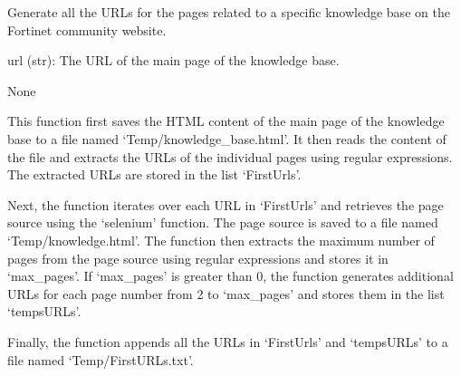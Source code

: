 \documentclass[letterpaper,10pt,english]{sphinxmanual}
\begin{document}
\begin{fulllineitems}
\label{\detokenize{Project.Script:Project.Script.RecupKbFortinet.generateAllPagesUrls}}
\pysigstartsignatures
{}
\pysigstopsignatures
\sphinxAtStartPar
Generate all the URLs for the pages related to a specific knowledge base on the Fortinet community website.
\begin{description}
\sphinxAtStartPar
url (str): The URL of the main page of the knowledge base.

\sphinxAtStartPar
None

\end{description}

\sphinxAtStartPar
This function first saves the HTML content of the main page of the knowledge base to a file named ‘Temp/knowledge\_base.html’.
It then reads the content of the file and extracts the URLs of the individual pages using regular expressions.
The extracted URLs are stored in the list ‘FirstUrls’.

\sphinxAtStartPar
Next, the function iterates over each URL in ‘FirstUrls’ and retrieves the page source using the ‘selenium’ function.
The page source is saved to a file named ‘Temp/knowledge.html’.
The function then extracts the maximum number of pages from the page source using regular expressions and stores it in ‘max\_pages’.
If ‘max\_pages’ is greater than 0, the function generates additional URLs for each page number from 2 to ‘max\_pages’ and stores them in the list ‘tempsURLs’.

\sphinxAtStartPar
Finally, the function appends all the URLs in ‘FirstUrls’ and ‘tempsURLs’ to a file named ‘Temp/FirstURLs.txt’.

\end{fulllineitems}

\end{document}
